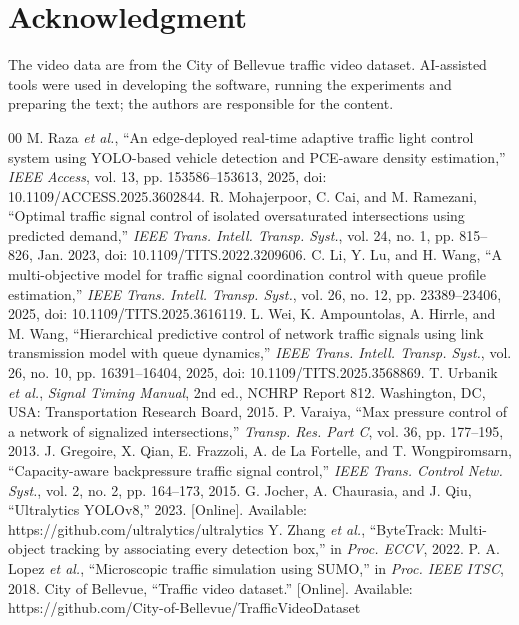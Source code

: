 \documentclass[journal]{IEEEtran}
\begin{document}
\section*{Acknowledgment}
The video data are from the City of Bellevue traffic video dataset. AI-assisted tools were
used in developing the software, running the experiments and preparing the text; the authors are responsible for the content.

\begin{thebibliography}{00}
 M. Raza \emph{et al.}, ``An edge-deployed real-time adaptive traffic
light control system using YOLO-based vehicle detection and PCE-aware density
estimation,'' \emph{IEEE Access}, vol. 13, pp. 153586--153613, 2025, doi: 10.1109/ACCESS.2025.3602844.
 R. Mohajerpoor, C. Cai, and M. Ramezani, ``Optimal traffic
signal control of isolated oversaturated intersections using predicted demand,''
\emph{IEEE Trans. Intell. Transp. Syst.}, vol. 24, no. 1, pp. 815--826, Jan. 2023, doi: 10.1109/TITS.2022.3209606.
 C. Li, Y. Lu, and H. Wang, ``A multi-objective model for traffic signal
coordination control with queue profile estimation,'' \emph{IEEE Trans. Intell. Transp.
Syst.}, vol. 26, no. 12, pp. 23389--23406, 2025, doi: 10.1109/TITS.2025.3616119.
 L. Wei, K. Ampountolas, A. Hirrle, and M. Wang, ``Hierarchical predictive control
of network traffic signals using link transmission model with queue dynamics,''
\emph{IEEE Trans. Intell. Transp. Syst.}, vol. 26, no. 10, pp. 16391--16404, 2025, doi: 10.1109/TITS.2025.3568869.
 T. Urbanik \emph{et al.}, \emph{Signal Timing Manual}, 2nd ed., NCHRP
Report 812. Washington, DC, USA: Transportation Research Board, 2015.
 P. Varaiya, ``Max pressure control of a network of signalized
intersections,'' \emph{Transp. Res. Part C}, vol. 36, pp. 177--195, 2013.
 J. Gregoire, X. Qian, E. Frazzoli, A. de La Fortelle, and T.
Wongpiromsarn, ``Capacity-aware backpressure traffic signal control,'' \emph{IEEE Trans.
Control Netw. Syst.}, vol. 2, no. 2, pp. 164--173, 2015.
 G. Jocher, A. Chaurasia, and J. Qiu, ``Ultralytics YOLOv8,'' 2023.
[Online]. Available: https://github.com/ultralytics/ultralytics
 Y. Zhang \emph{et al.}, ``ByteTrack: Multi-object tracking by
associating every detection box,'' in \emph{Proc. ECCV}, 2022.
 P. A. Lopez \emph{et al.}, ``Microscopic traffic simulation using SUMO,''
in \emph{Proc. IEEE ITSC}, 2018.
 City of Bellevue, ``Traffic video dataset.'' [Online]. Available:
https://github.com/City-of-Bellevue/TrafficVideoDataset
\end{thebibliography}
\end{document}
